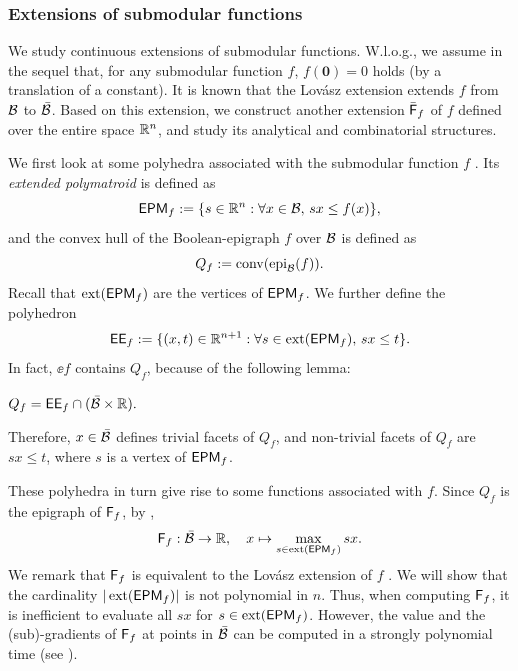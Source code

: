\subsubsection{Extensions of submodular functions}
\label{sec.extension}

 We study continuous extensions of submodular functions. W.l.o.g., we assume  in the sequel that, for any submodular function $f$, $f(\mathbf{0}) = 0$ holds (by a translation of a constant). It is known that the Lovász extension \cite{lovasz1983submodular} extends $f$ from $\mathcal B$ to $\bar{\mathcal B}$. Based on this extension, we construct another  extension $\bar{\mathsf F}_{f}$ of $f$ defined over the entire space $\mathbb R^n$, and study its analytical and combinatorial structures.


 We first look at some polyhedra associated with the submodular function $f$ \cite{Atamturk2021,schrijver2003combinatorial}.  Its \textit{extended polymatroid} is defined as 
 \begin{equation}
     \label{eq.epf}
     \mathsf{EPM}_{f} :=\{s \in \mathbb R^n:\forall x \in \mathcal B,\, s  x \le f(x)\},
 \end{equation}
 and the convex hull of the Boolean-epigraph $f$ over $\mathcal B$ is defined as \[Q_f:= \operatorname{conv}(\operatorname{epi}_{\mathcal B}(f)).\] Recall that $\operatorname{ext}(\mathsf{EPM}_{f})$ are the vertices of $\mathsf{EPM}_{f}$. We  further define the polyhedron
 \begin{equation}
	 \label{eq.ee}
	 \mathsf{EE}_{f}  := \{(x,t) \in \mathbb R^{n+1}: \forall s \in \operatorname{ext}(\mathsf{EPM}_{f}),\, sx \le t\}.
 \end{equation}
In fact, $\ee{f}$ contains $Q_f$, because of the following lemma:
 \begin{lemma}
\label{lem.at}
$ Q_f =  \mathsf{EE}_{f}  \cap (\bar{\mathcal B} \times \mathbb R).$
\end{lemma}

Therefore, $x \in \bar{\mathcal B}$ defines trivial facets of $Q_f$, and non-trivial facets of $Q_f$ are  $sx \le t$, where $s$ is a vertex of $\mathsf{EPM}_{f}$.

These polyhedra in turn give rise to some functions associated with $f$.   Since $Q_f$ is the epigraph of ${\mathsf F}_f$, by , 
\begin{equation}
    \label{eq.sf_f}
    {\mathsf F}_f: \bar{\mathcal B} \to \mathbb R, \quad x \mapsto \max_{s \in \operatorname{ext}(\mathsf{EPM}_{f})}sx.
\end{equation}
We remark that  ${\mathsf F}_f$ is equivalent to the Lovász extension of $f$ \cite{Atamturk2021}. We will show that the cardinality $|\operatorname{ext}(\mathsf{EPM}_{f})|$ is not polynomial in $n$. Thus, when computing ${\mathsf F}_f$, it is inefficient to evaluate all $sx$ for $s \in \operatorname{ext}(\mathsf{EPM}_{f})$. However, the value and the (sub)-gradients of  ${\mathsf F}_f$ at points in  $\bar{\mathcal B}$ can be computed in a strongly polynomial time (see ).

